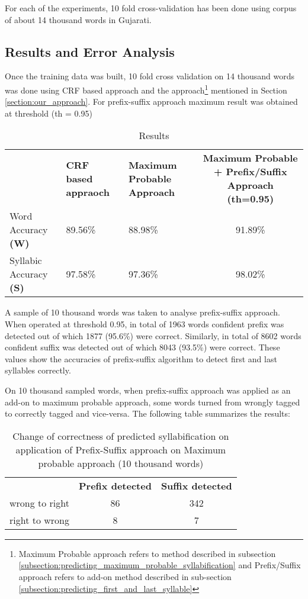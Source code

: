 \documentclass[runningheads,a4paper]{llncs}
\begin{document}
For each of the experiments, 10 fold cross-validation has been done using corpus of about 14 thousand words in Gujarati.


\subsection{Results and Error Analysis}
\label{subsection:results_and_error_analysis}

Once the training data was built, 10 fold cross validation on 14 thousand words was done using CRF based approach and the approach\footnote{Maximum Probable approach refers to method described in subsection \ref{subsection:predicting_maximum_probable_syllabification} and Prefix/Suffix approach refers to add-on method described in sub-section \ref{subsection:predicting_first_and_last_syllable} } mentioned in Section \ref{section:our_approach}. For prefix-suffix approach maximum result was obtained at threshold (th = 0.95)

\begin{table}[H]
\caption{ Results } 
\centering
\begin{tabular}{FFFS}\hline
\noalign{\smallskip} \bf & \bf CRF based appraoch & \bf Maximum Probable Approach & \bf Maximum Probable + Prefix/Suffix Approach (th=0.95) \\ \noalign{\smallskip} \hline
\noalign{\smallskip}  Word Accuracy \textbf{(W)}     & 89.56\% & 88.98\% & 91.89\% \\\hline
\noalign{\smallskip}  Syllabic Accuracy \textbf{(S)} & 97.58\% & 97.36\% & 98.02\% \\\hline
\end{tabular}
\label{table:results}
\end{table}

A sample of 10 thousand words was taken to analyse prefix-suffix approach. When operated at threshold 0.95, in total of 1963 words confident prefix was detected out of which 1877 (95.6\%) were correct. Similarly, in total of 8602 words confident suffix was detected out of which 8043 (93.5\%) were correct. These values show the accuracies of prefix-suffix algorithm to detect first and last syllables correctly.

On 10 thousand sampled words, when prefix-suffix approach was applied as an add-on to maximum probable approach, some words turned from wrongly tagged to correctly tagged and vice-versa. The following table summarizes the results:

\begin{table}[H]
\caption{ Change of correctness of predicted syllabification on application of Prefix-Suffix approach on Maximum probable approach (10 thousand words)}
\centering
\begin{tabular}{FSS}\hline
\noalign{\smallskip}  \bf & \bf Prefix detected & \bf Suffix detected \\ \noalign{\smallskip}   \hline
\noalign{\smallskip}  wrong to right & 86 & 342 \\\hline
\noalign{\smallskip}  right to wrong & 8  & 7   \\\hline
\end{tabular}
\end{table}
\end{document}
